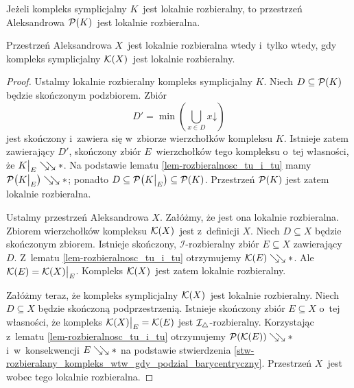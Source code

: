 \begin{stw}\label{stw-slaba_rozbieralnosc_tu_i_tu}
Jeżeli kompleks symplicjalny $K$~jest lokalnie rozbieralny, to  przestrzeń Aleksandrowa $\mathcal{P}(K)$~jest lokalnie rozbieralna.

Przestrzeń Aleksandrowa $X$~jest lokalnie rozbieralna wtedy i~tylko wtedy, gdy kompleks symplicjalny $\mathcal{K}(X)$~jest lokalnie rozbieralny. 
\end{stw}
\begin{proof}
Ustalmy lokalnie rozbieralny kompleks symplicjalny $K$. Niech $D\subseteq \mathcal{P}(K)$ będzie skończonym podzbiorem. Zbiór \[D'=\min\left(\bigcup_{x\in D}x\mathord{\downarrow}\right)\] jest skończony i~zawiera się w~zbiorze wierzchołków kompleksu $K$. Istnieje zatem zawierający $D'$, skończony zbiór $E$~wierzchołków tego kompleksu o~tej własności, że $K\big|_E\searrow\!\!\searrow *$. Na podstawie lematu \ref{lem-rozbieralnosc_tu_i_tu} mamy $\mathcal{P}\bigl(K\big|_E\bigr)\searrow\!\!\searrow *$; ponadto $D\subseteq \mathcal{P}\bigl(K\big|_E\bigr)\subseteq \mathcal{P}(K)$. Przestrzeń $\mathcal{P}(K)$ jest zatem lokalnie rozbieralna.

Ustalmy przestrzeń Aleksandrowa $X$. Załóżmy, że jest ona lokalnie rozbieralna. Zbiorem wierzchołków kompleksu $\mathcal{K}(X)$~jest z~definicji $X$. Niech $D\subseteq X$ będzie skończonym zbiorem. Istnieje skończony, $\mathcal{I}$-rozbieralny zbiór $E\subseteq X$ zawierający $D$. Z~lematu \ref{lem-rozbieralnosc_tu_i_tu} otrzymujemy $\mathcal{K}(E)\searrow\!\!\searrow *$. Ale $\mathcal{K}(E)=\mathcal{K}(X)\big|_E$. Kompleks $\mathcal{K}(X)$~jest zatem lokalnie rozbieralny.

Załóżmy teraz, że kompleks symplicjalny $\mathcal{K}(X)$~jest lokalnie rozbieralny. Niech $D\subseteq X$ będzie skończoną podprzestrzenią. Istnieje skończony zbiór $E\subseteq X$ o~tej własności, że kompleks $\mathcal{K}(X)\big|_E=\mathcal{K}(E)$ jest $\mathcal{I}_\triangle$-rozbieralny. Korzystając z~lematu \ref{lem-rozbieralnosc_tu_i_tu} otrzymujemy $\mathcal{P}(\mathcal{K}(E))\searrow\!\!\searrow *$ i~w~konsekwencji $E\searrow\!\!\searrow *$ na podstawie stwierdzenia \ref{stw-rozbieralany_kompleks_wtw_gdy_podzial_barycentryczny}. Przestrzeń $X$~jest wobec tego lokalnie rozbieralna.
\end{proof}

